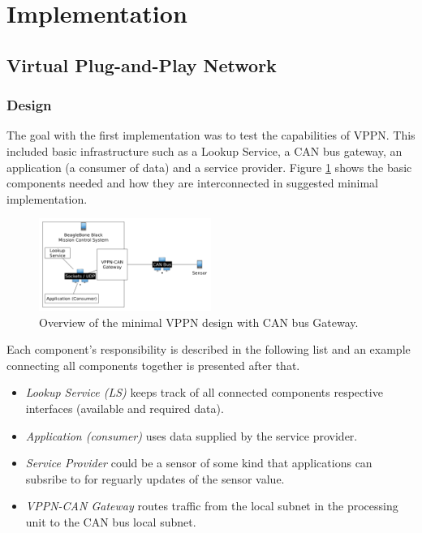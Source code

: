 \section{Implementation}\label{sec:implementation}
\subsection{Virtual Plug-and-Play Network}
\subsubsection{Design}
The goal with the first implementation was to test the capabilities of VPPN.
This included basic infrastructure such as a Lookup Service, a CAN bus
gateway, an application (a consumer of data) and a service provider. Figure
\ref{fig:vppn-overview} shows the basic components needed and how they are
interconnected in suggested minimal implementation.

\begin{figure}[h]
    \includegraphics[width=0.5\textwidth]{./figure/vppn-overview.png}
    \caption{Overview of the minimal VPPN design with CAN bus Gateway.}
    \label{fig:vppn-overview}
\end{figure}

Each component's responsibility is described in the following list and an
example connecting all components together is presented after that.
\begin{itemize}
    \item {\em Lookup Service (LS)} keeps track of all connected components
        respective interfaces (available and required data).
    \item {\em Application (consumer)} uses data supplied by the service
        provider.
    \item {\em Service Provider} could be a sensor of some kind that
        applications can subsribe to for reguarly updates of the sensor value.
    \item {\em VPPN-CAN Gateway} routes traffic from the local subnet in the
        processing unit to the CAN bus local subnet.
\end{itemize}

